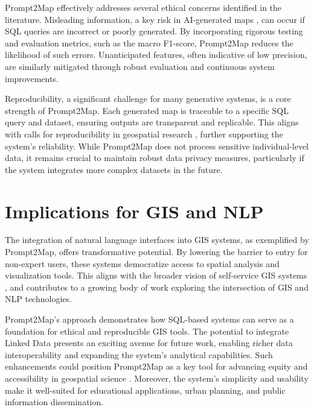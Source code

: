 Prompt2Map effectively addresses several ethical concerns identified in the literature. Misleading information, a key risk in AI-generated maps \cite{zhang_ethics_2023}, can occur if SQL queries are incorrect or poorly generated. By incorporating rigorous testing and evaluation metrics, such as the macro F1-score, Prompt2Map reduces the likelihood of such errors. Unanticipated features, often indicative of low precision, are similarly mitigated through robust evaluation and continuous system improvements.

Reproducibility, a significant challenge for many generative systems, is a core strength of Prompt2Map. Each generated map is traceable to a specific SQL query and dataset, ensuring outputs are transparent and replicable. This aligns with calls for reproducibility in geospatial research \cite{zhang_ethics_2023}, further supporting the system's reliability. While Prompt2Map does not process sensitive individual-level data, it remains crucial to maintain robust data privacy measures, particularly if the system integrates more complex datasets in the future.

\section{Implications for GIS and NLP}

The integration of natural language interfaces into GIS systems, as exemplified by Prompt2Map, offers transformative potential. By lowering the barrier to entry for non-expert users, these systems democratize access to spatial analysis and visualization tools. This aligns with the broader vision of self-service GIS systems \cite{rowland_towards_2020}, and contributes to a growing body of work exploring the intersection of GIS and NLP technologies.

Prompt2Map's approach demonstrates how SQL-based systems can serve as a foundation for ethical and reproducible GIS tools. The potential to integrate Linked Data presents an exciting avenue for future work, enabling richer data interoperability and expanding the system's analytical capabilities. Such enhancements could position Prompt2Map as a key tool for advancing equity and accessibility in geospatial science \cite{wang_gpt_2024}. Moreover, the system's simplicity and usability make it well-suited for educational applications, urban planning, and public information dissemination.


